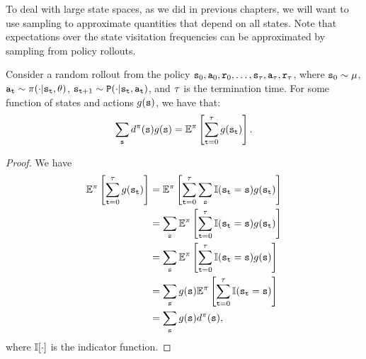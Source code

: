 To deal with large state spaces, as we did in previous chapters, we will want to use sampling to approximate quantities that depend on all states. Note that expectations over the state visitation frequencies can be approximated by sampling from policy rollouts.
\begin{proposition}\label{prop:rollout_sampling}
    Consider a random rollout from the policy ${\tt s}_0,{\tt a}_0,{\tt r}_0,\dots,{\tt s}_\tau, {\tt a}_\tau, {\tt r}_\tau$, where ${\tt s}_0 \sim \mu$, ${\tt a}_{\tt t}\sim \pi(\cdot|{\tt s}_{\tt t},\theta)$, ${\tt s}_{{\tt t}+1} \sim {\tt P} (\cdot | {\tt s}_{\tt t}, {\tt a}_{\tt t})$, and $\tau$ is the termination time. For some function of states and actions $g({\tt s})$, we have that:
    \begin{equation*}
        \sum_{{\tt s}} d^{\pi}({\tt s}) g({\tt s}) = \mathbb{E}^{\pi}\left[ \sum_{{\tt t}=0}^\tau g({\tt s}_{\tt t})\right].
    \end{equation*}
\end{proposition}
\begin{proof}
    We have
    \begin{equation*}
        \begin{split}
            \mathbb{E}^{\pi}\left[ \sum_{{\tt t}=0}^\tau g({\tt s}_{\tt t})\right] &= \mathbb{E}^{\pi}\left[ \sum_{{\tt t}=0}^\tau \sum_{{\tt s}} \mathbb{I}({\tt s}_{\tt t} = {\tt s})g({\tt s}_{\tt t})\right] \\
            &= \sum_{{\tt s}}\mathbb{E}^{\pi}\left[\sum_{{\tt t}=0}^\tau \mathbb{I}({\tt s}_{\tt t} = {\tt s})g({\tt s}_{\tt t})\right] \\
            &= \sum_{{\tt s}}\mathbb{E}^{\pi}\left[\sum_{{\tt t}=0}^\tau \mathbb{I}({\tt s}_{\tt t} = {\tt s})g({\tt s})\right] \\
            &= \sum_{{\tt s}}g({\tt s})\mathbb{E}^{\pi}\left[\sum_{{\tt t}=0}^\tau \mathbb{I}({\tt s}_{\tt t} = {\tt s})\right] \\
            &= \sum_{{\tt s}}g({\tt s})d^{\pi}({\tt s}) ,
        \end{split}
    \end{equation*}
where $\mathbb{I}[\cdot]$ is the indicator function.
\end{proof}

